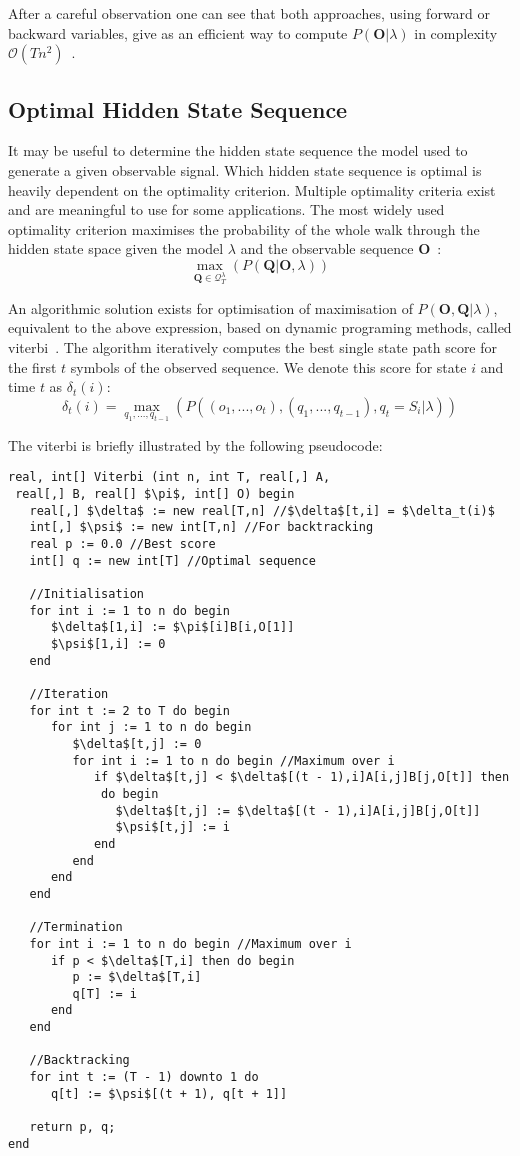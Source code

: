 After a careful observation one can see that both approaches, using forward or backward variables, give as an efficient way to compute $P(\mathbf{O}|\lambda)$ in complexity $\mathcal{O}(Tn^2)$~\cite{Rabiner89hmm}.

\subsection{Optimal Hidden State Sequence}

It may be useful to determine the hidden state sequence the model used to generate a given observable signal. Which hidden state sequence is optimal is heavily dependent on the optimality criterion. Multiple optimality criteria exist and are meaningful to use for some applications. The most widely used optimality criterion maximises the probability of the whole walk through the hidden state space given the model $\lambda$ and the observable sequence $\mathbf{O}$~\cite{Rabiner89hmm}:
$$\max_{\mathbf{Q}\in\mathcal{Q}_T^\lambda}(P(\mathbf{Q}|\mathbf{O}, \lambda))$$

An algorithmic solution exists for optimisation of maximisation of $P(\mathbf{O}, \mathbf{Q}|\lambda)$, equivalent to the above expression, based on dynamic programing methods, called \gls{viterbi}~\cite{Viterbi1967, Forney1973}. The algorithm iteratively computes the best single state path score for the first $t$ symbols of the observed sequence. We denote this score for state $i$ and time $t$ as $\delta_t(i)$:
$$\delta_t(i) = \max_{q_1, ..., q_{t-1}}(P((o_1, ..., o_t), (q_1, ..., q_{t-1}), q_t=S_i|\lambda))$$

The \gls{viterbi} is briefly illustrated by the following pseudocode:
\begin{lstlisting}[mathescape=true]
real, int[] Viterbi (int n, int T, real[,] A,
 real[,] B, real[] $\pi$, int[] O) begin
   real[,] $\delta$ := new real[T,n] //$\delta$[t,i] = $\delta_t(i)$
   int[,] $\psi$ := new int[T,n] //For backtracking
   real p := 0.0 //Best score
   int[] q := new int[T] //Optimal sequence
   
   //Initialisation
   for int i := 1 to n do begin
      $\delta$[1,i] := $\pi$[i]B[i,O[1]]
      $\psi$[1,i] := 0
   end
   
   //Iteration
   for int t := 2 to T do begin
      for int j := 1 to n do begin
         $\delta$[t,j] := 0
         for int i := 1 to n do begin //Maximum over i
            if $\delta$[t,j] < $\delta$[(t - 1),i]A[i,j]B[j,O[t]] then
             do begin
               $\delta$[t,j] := $\delta$[(t - 1),i]A[i,j]B[j,O[t]]
               $\psi$[t,j] := i
            end
         end
      end
   end
   
   //Termination
   for int i := 1 to n do begin //Maximum over i
      if p < $\delta$[T,i] then do begin
         p := $\delta$[T,i]
         q[T] := i
      end
   end
   
   //Backtracking
   for int t := (T - 1) downto 1 do
      q[t] := $\psi$[(t + 1), q[t + 1]]

   return p, q;
end
\end{lstlisting}

